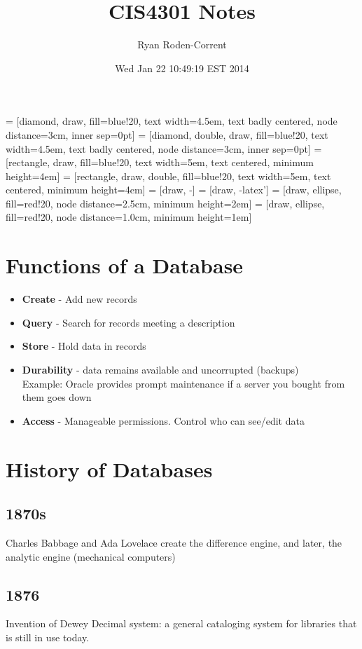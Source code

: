 \documentclass{article}
\title{CIS4301 Notes}
\author{Ryan Roden-Corrent}
\date{Wed Jan 22 10:49:19 EST 2014}
\begin{document}
\setlength\parindent{0pt}
 = [diamond, draw, fill=blue!20, text width=4.5em,
  text badly centered, node distance=3cm, inner sep=0pt]
 = [diamond, double, draw, fill=blue!20, text width=4.5em,
  text badly centered, node distance=3cm, inner sep=0pt]
 = [rectangle, draw, fill=blue!20, text width=5em,
  text centered, minimum height=4em]
 = [rectangle, draw, double, fill=blue!20, text width=5em,
  text centered, minimum height=4em]
 = [draw, -]
 = [draw, -latex']
 = [draw, ellipse, fill=red!20, node distance=2.5cm,
  minimum height=2em]
 = [draw, ellipse, fill=red!20, node distance=1.0cm,
  minimum height=1em]
\maketitle

\section{Functions of a Database}
\begin{itemize}
    \item \textbf{Create} - Add new records
    \item \textbf{Query} - Search for records meeting a description
    \item \textbf{Store} - Hold data in records
    \item \textbf{Durability} - data remains available and uncorrupted (backups)\\
        Example: Oracle provides prompt maintenance if a server you bought from
        them goes down
    \item \textbf{Access} - Manageable permissions. Control who can see/edit
        data
\end{itemize}

\section{History of Databases}
\subsection*{1870s}
Charles Babbage and Ada Lovelace create the difference engine, and later, the
analytic engine (mechanical computers)
\subsection*{1876}
Invention of Dewey Decimal system: a general cataloging system for libraries
that is still in use today.
\end{document}
